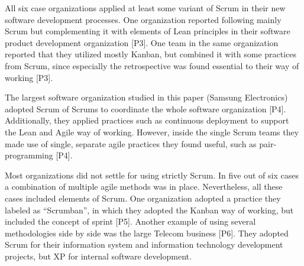 All six case organizations applied at least some variant of Scrum in
their new software development processes. One organization reported
following mainly Scrum but complementing it with elements of Lean
principles in their software product development organization [P3].
One team in the same organization reported that they utilized mostly
Kanban, but combined it with some practices from Scrum, since especially
the retrospective was found essential to their way of working [P3].

The largest software organization studied in this paper (Samsung
Electronics) adopted Scrum of Scrums to coordinate the whole software
organization [P4]. Additionally, they applied practices such as
continuous deployment to support the Lean and Agile way of working.
However, inside the single Scrum teams they made use of single, separate
agile practices they found useful, such as pair-programming [P4].

Most organizations did not settle for using strictly Scrum. In five
out of six cases a combination of multiple agile methods was in
place. Nevertheless, all these cases included elements of Scrum. One
organization adopted a practice they labeled as ``Scrumban'', in which
they adopted the Kanban way of working, but included the concept of
sprint [P5]. Another example of using several methodologies side by
side was the large Telecom business [P6]. They adopted Scrum for their
information system and information technology development projects, but
XP for internal software development.

\bigskip

\bigskip

